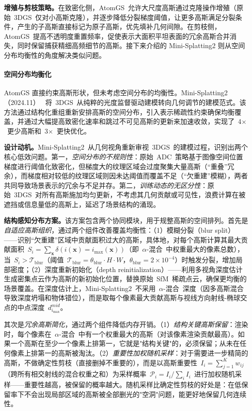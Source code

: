 \textbf{增殖与剪枝策略。}在致密化侧，AtomGS~允许大尺度高斯通过克隆操作增殖（原始~3DGS~仅对小高斯克隆），并逐步降低分裂梯度阈值，让更多高斯满足分裂条件，产生的子高斯直接标记为原子高斯，优先填补几何间隙。在剪枝侧，AtomGS~提高不透明度重置频率，促使表示大面积平坦表面的冗余高斯合并消失，同时保留捕获精细高频细节的高斯。接下来介绍的 Mini-Splatting2 则从空间分布均衡性的角度解决类似问题。

\paragraph{空间分布均衡化}

AtomGS 直接约束高斯形状，但未考虑空间分布的均衡性。Mini-Splatting2（2024.11）~\cite{2411_12788} 将~3DGS~从纯粹的光度监督驱动建模转向几何调节的建模范式。该方法通过结构化重组重新安排高斯的空间分布，引入表示稀疏性约束确保均衡覆盖，并通过大幅提高致密化速率和跳过不可见高斯的更新来加速收敛，实现了~4$\times$~更少高斯和~3$\times$~更快优化。

\textbf{设计动机。}Mini-Splatting2~从几何视角重新审视~3DGS~的建模过程，识别出两个核心低效问题。第一，\emph{空间分布的不规则性}：原始~ADC~策略基于图像空间位置梯度进行阈值化致密化，但梯度大的纹理区域会过度聚集大量高斯（“重叠”冗余），而梯度相对较低的纹理区域则因未达阈值而覆盖不足（“欠重建”模糊），两者共同导致场景表示的冗余与不足并存。第二，\emph{训练动态的无区分性}：原始~3DGS~对所有高斯施加均匀更新，不考虑其几何贡献或可见性，浪费计算在被遮挡或信息量低的高斯上，延迟了场景结构的涌现。

\textbf{结构感知分布方案。}该方案包含两个协同模块，用于规整高斯的空间排列。首先是\emph{自适应高斯组织}，通过两个组件改善覆盖均衡性：（1）模糊分裂（blur split）——识别``欠重建''区域中贡献面积过大的高斯，具体地，对每个高斯计算其最大贡献面积~$S_i = \sum_{\mathbf{x}} \delta(i(\mathbf{x}) = i_{\max}(\mathbf{x}))$（即~$\alpha$-混合~中权重最大的像素总数），当~$S_i > \mathcal{T}_{\text{blur}}$（阈值~$\mathcal{T}_{\text{blur}} = \theta_{\text{blur}} \cdot H \cdot W$，$\theta_{\text{blur}} = 2 \times 10^{-4}$）时触发分裂，增加局部密度；（2）深度重新初始化（depth reinitialization）——利用多视角深度估计生成密集点云作为高斯的新初始化位置，替换原始~SfM~稀疏点云，确保更均衡的场景覆盖。在深度估计上，Mini-Splatting2~不采用~$\alpha$-混合~深度（因多高斯混合导致深度坍塌和物体错位），而是取每个像素最大贡献高斯与视线方向射线-椭球交点的中点深度~$d^{mid}_{i_{\max}}$。

其次是\emph{冗余高斯简化}，通过两个组件降低内存开销。（1）\emph{结构关键高斯保留}：渲染时，每个像素在~$\alpha$-混合~中有一个权重最大的高斯（对该像素渲染贡献最高）。如果一个高斯在至少一个像素上排第一，它就是"结构关键"的，必须保留；从未在任何像素上排第一的高斯被淘汰。（2）\emph{重要性加权随机采样}：对于需要进一步精简的高斯，不做确定性剪枝（直接删掉不重要的），而是以高斯重要性~$I_i = \sum_{j=1}^{K} w_{ij}$（跨所有相交射线的混合权重之和）为采样概率~$\mathcal{P}_i = I_i / \sum_{i} I_i$~进行加权随机采样——重要性越高，被保留的概率越大。随机采样比确定性剪枝的好处是：在低保留率下不会出现局部区域的高斯被全部删光的"空洞"问题，能更好地保留几何连续性。


